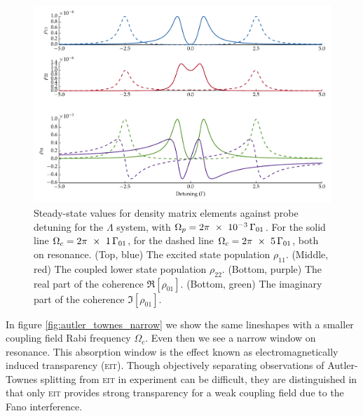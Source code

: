     \begin{figure}[h]
      \includegraphics[width=\linewidth]
        {figs/04_polaritons/plot_steady_scan_p000_1_c1_c5_fig1.pdf}
      \caption{
      Steady-state values for density matrix elements against probe detuning for
      the $\Lambda$ system, with $\Omega_p =
      \unit[2\pi~\times~10^{-3}]{\Gamma_{01}}$. For the solid line $\Omega_c =
      \unit[2\pi~\times~1]{\Gamma_{01}}$, for the dashed line $\Omega_c =
      \unit[2\pi~\times~5]{\Gamma_{01}}$, both on resonance. (Top, blue) The
      excited state population $\rho_{11}$. (Middle, red) The coupled lower
      state population $\rho_{22}$. (Bottom, purple) The real part of the
      coherence  $\Re \left[ \rho_{01} \right]$. (Bottom, green) The imaginary
      part of the coherence  $\Im \left[ \rho_{01} \right]$.
      }
      \label{fig:autler_townes}
    \end{figure}

    In figure \ref{fig:autler_townes_narrow} we show the same lineshapes with a
    smaller coupling field Rabi frequency $\Omega_c$. Even then we see a narrow
    window on resonance. This absorption window is the effect known as
    electromagnetically induced transparency (\textsc{eit}). Though objectively
    separating observations of Autler-Townes splitting from \textsc{eit} in
    experiment can be difficult\cite{Anisimov2011}, they are distinguished in
    that only \textsc{eit} provides strong transparency for a weak coupling
    field due to the Fano interference.\cite{Fano1961}


